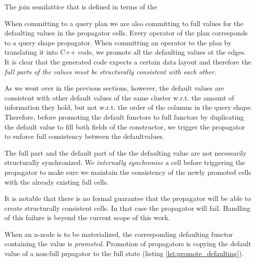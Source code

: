 \begin{code}
  \label{lst:defaulting_semigroup}
  \caption{The join semilattice that is defined in terms of the}
\end{code}

When committing to a query plan we are also committing to full values
for the defaulting values in the propagator cells. Every operator of
the plan corresponds to a query shape propagator. When committing an
operator to the plan by translating it into C++ code, we promote all
the defaulting values at the edges. It is clear that the generated
code expects a certain data layout and therefore the \emph{full parts
  of the values must be structurally consistent with each other}.

As we went over in the previous sections, however, the default values are
consistent with other default values of the same cluster w.r.t. the amount of information they hold,
but not w.r.t. the order of the columns in the query shape. Therefore, before promoting the
default functors to full functors by duplicating the default value to fill both
fields of the  constructor, we trigger the propagator to enforce
full consistency between the defaultvalues.

The full part and the default part of the the defaulting value are not
necessarily structurally synchronized. We \emph{internally synchronise} a
cell before triggering the propagator to make sure we maintain the
consistency of the newly promoted cells with the already existing full
cells.

It is notable that there is no formal guarantee that the propagator
will be able to create structurally consistent cells. In that case the
propagator will fail. Handling of this failure is beyond the current
scope of this work.

When an n-node is to be materialized, the corresponding defaulting
functor containing the value is \emph{promoted}.  Promotion of propagators
is copying the default value of a non-full prpagator to the full
state (listing \ref{lst:promote_defaulting}).


